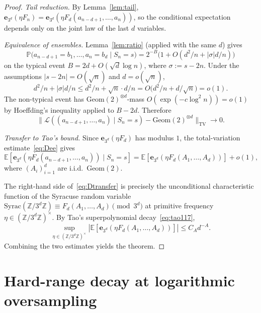 \documentclass[11pt,a4paper]{amsart}
\theoremstyle{plain}
\theoremstyle{definition}
\newcommand{\Z}{\mathbb{Z}}
\newcommand{\E}{\mathbb{E}}
\newcommand{\PP}{\mathbb{P}}
\newcommand{\TV}{\mathrm{TV}}
\newcommand{\Geom}{\mathrm{Geom}}
\newcommand{\Syrac}{\mathrm{Syrac}}
\begin{document}
\begin{proof}
\emph{Tail reduction.}
By Lemma~\ref{lem:tail},
$\mathbf e_{3^d}(\eta F_n)=\mathbf e_{3^d}(\eta F_d(a_{n-d+1},\dots,a_n))$,
so the conditional expectation depends only on the joint law of the last
$d$ variables.

\emph{Equivalence of ensembles.}
Lemma~\ref{lem:ratio} (applied with the same $d$) gives
\begin{equation}\label{eq:Dratio}
\PP\bigl(a_{n-d+1}=b_1,\dots,a_n=b_d\mid S_n=s\bigr)
=2^{-B}\bigl(1+O(d^2/n+|\sigma|d/n)\bigr)
\end{equation}
on the typical event $B=2d+O(\sqrt d\log n)$, where $\sigma:=s-2n$.
Under the assumptions $|s-2n|=O(\sqrt n)$ and $d=o(\sqrt n)$,
$$
d^2/n+|\sigma|d/n\le d^2/n+\sqrt n\cdot d/n=O\bigl(d^2/n+d/\sqrt n\bigr)=o(1).
$$
The non-typical event has $\Geom(2)^{\otimes d}$-mass $O(\exp(-c\log^2 n))=o(1)$
by Hoeffding's inequality applied to $B-2d$.
Therefore
\begin{equation}\label{eq:Dee}
\bigl\|\mathcal L((a_{n-d+1},\dots,a_n)\mid S_n=s)-\Geom(2)^{\otimes d}\bigr\|_{\TV}\to 0.
\end{equation}

\emph{Transfer to Tao's bound.}
Since $\mathbf e_{3^d}(\eta F_d)$ has modulus $1$, the total-variation
estimate~\eqref{eq:Dee} gives
\begin{equation}\label{eq:Dtransfer}
\E[\mathbf e_{3^d}(\eta F_d(a_{n-d+1},\dots,a_n))\mid S_n=s]
=\E[\mathbf e_{3^d}(\eta F_d(A_1,\dots,A_d))]+o(1),
\end{equation}
where $(A_i)_{i=1}^d$ are i.i.d.\ $\Geom(2)$.

The right-hand side of~\eqref{eq:Dtransfer} is precisely the unconditional
characteristic function of the Syracuse random variable
$\Syrac(\Z/3^d\Z)\equiv F_d(A_1,\dots,A_d)\pmod{3^d}$ at primitive
frequency $\eta\in(\Z/3^d\Z)^\times$.
By Tao's superpolynomial decay~\eqref{eq:tao117},
$$
\sup_{\eta\in(\Z/3^d\Z)^\times}|\E[\mathbf e_{3^d}(\eta F_d(A_1,\dots,A_d))]|\le C_A d^{-A}.
$$
Combining the two estimates yields the theorem.
\end{proof}

\section{Hard-range decay at logarithmic oversampling}\label{sec:logh}
\end{document}
